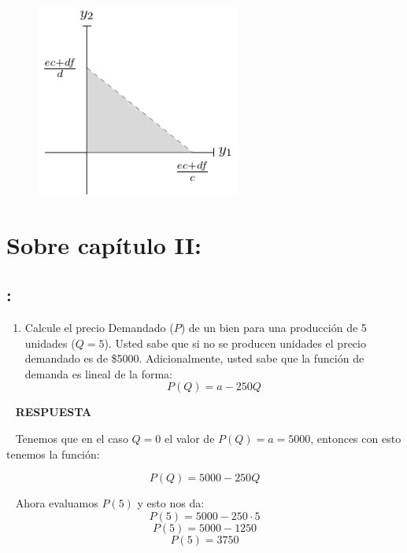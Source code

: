 \documentclass[
  letterpaper,
  DIV=11,
  numbers=noendperiod]{scrreport}
\providecommand{\tightlist}{%
  \setlength{\itemsep}{0pt}\setlength{\parskip}{0pt}}\usepackage{longtable,booktabs,array}
\begin{document}
\begin{figure}

{\centering \includegraphics[width=0.6\textwidth,height=\textheight]{8ej_pauta_files/figure-pdf/unnamed-chunk-2-1.pdf}

}

\end{figure}

\hypertarget{sobre-capuxedtulo-ii-1}{%
\section{Sobre capítulo II:}\label{sobre-capuxedtulo-ii-1}}

\hypertarget{section-25}{%
\subsection{:}\label{section-25}}

\begin{enumerate}
\def\labelenumi{\arabic{enumi})}
\tightlist
\item
  Calcule el precio Demandado (\(P\)) de un bien para una producción de
  5 unidades (\(Q=5\)). Usted sabe que si no se producen unidades el
  precio demandado es de \$5000. Adicionalmente, usted sabe que la
  función de demanda es lineal de la forma: \[P(Q)=a-250Q\]
\end{enumerate}

~ \textbf{RESPUESTA}

~ Tenemos que en el caso \(Q=0\) el valor de \(P(Q)=a=5000\), entonces
con esto tenemos la función:

\[
P(Q)=5000-250Q
\]

~ Ahora evaluamos \(P(5)\) y esto nos da: \[
P(5)=5000-250\cdot 5
\] \[
P(5)=5000-1250
\] \[
P(5)=3750
\]
\end{document}
